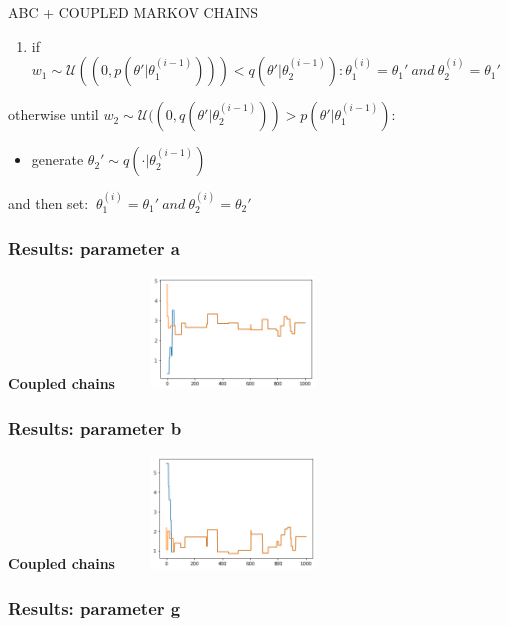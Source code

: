 \documentclass{beamer}
\begin{document}
\begin{section}{ABC + COUPLED MARKOV CHAINS}
\begin{frame}
\begin{enumerate}
		\item if $ w_{1}\sim \mathcal{U}((0, p(\theta'|\theta_{1}^{(i-1)}))) < q(\theta'|\theta_{2}^{(i-1)} ): \theta_{1}^{(i)}=\theta_{1}' \ and \ \theta_{2}^{(i)}= \theta_{1}'$
	\end{enumerate}
	otherwise until $ w_{2}\sim \mathcal{U}((0, q(\theta'|\theta_{2}^{(i-1)})) > p(\theta'|\theta_{1}^{(i-1)} )$:
	
	\begin{itemize}
		\item generate $ \theta_{2}' \sim q( \cdot |\theta_{2}^{(i-1)} ) $
		
		
	\end{itemize}
	and then set:   $ \ \theta_{1}^{(i)}=\theta_{1}' \ and \ \theta_{2}^{(i)}= \theta_{2}'$
	
	
\end{frame}



\begin{frame}
	\frametitle{Results: parameter a}
	
	\begin{center}
		{\scriptsize \textbf{Coupled chains}}
		\includegraphics[width=6cm,height=3cm]{immagini_mario/a_all_chains}
		
	\end{center}
\end{frame}

\begin{frame}
	\frametitle{Results: parameter b}
	
	\begin{center}
		{\scriptsize \textbf{Coupled chains}}
		\includegraphics[width=6cm,height=3cm]{immagini_mario/b_all_chains}
	\end{center}
	
\end{frame}
\begin{frame}
	\frametitle{Results: parameter g}
	\begin{center}
		

\end{center}
\end{frame}
\end{section}
\end{document}
